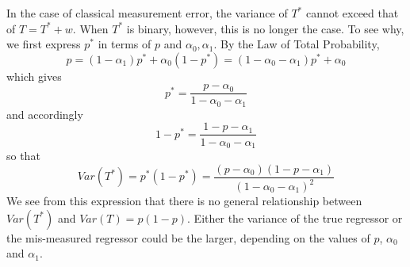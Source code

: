 In the case of classical measurement error, the variance of $T^*$ cannot exceed that of $T=T^*+w$.
When $T^*$ is binary, however, this is no longer the case.
To see why, we first express $p^*$ in terms of $p$ and $\alpha_0, \alpha_1$.
By the Law of Total Probability,
\begin{equation*}
 p = (1-\alpha_1)p^* + \alpha_0(1-p^*) = (1 - \alpha_0 - \alpha_1) p^* + \alpha_0
\end{equation*}
which gives
\begin{equation}
  p^* = \frac{p - \alpha_0}{1 - \alpha_0 - \alpha_1}
  \label{eq:Pstar}
\end{equation}
and accordingly
\begin{equation}
  1 - p^* = \frac{1 - p - \alpha_1}{1 -\alpha_0 - \alpha_1}
  \label{eq:1minusPstar}
\end{equation}
so that
\begin{equation}
  Var(T^*) = p^*(1-p^*) = \frac{(p-\alpha_0)(1-p-\alpha_1)}{(1-\alpha_0 -\alpha_1)^2}
  \label{eq:VarTstar}
\end{equation}
We see from this expression that there is no general relationship between $Var(T^*)$ and $Var(T) = p(1-p)$.
Either the variance of the true regressor or the mis-measured regressor could be the larger, depending on the values of $p$, $\alpha_0$ and $\alpha_1$.




